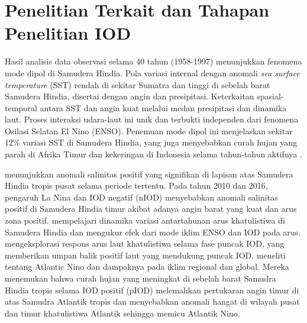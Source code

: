 \vspace{1.5pc}
\vspace{-1pc}
\section[Penelitian Terkait dan Tahapan Penelitian IOD]{Penelitian Terkait dan Tahapan Penelitian IOD}
\begin{spacing}{1.5}
	Hasil analisis data observasi selama 40 tahun (1958-1997) menunjukkan fenomena mode dipol di Samudera Hindia. Pola variasi internal dengan anomali \textit{sea surface temperature} (SST) rendah di sekitar Sumatra dan tinggi di sebelah barat Samudera Hindia, disertai dengan angin dan presipitasi. Keterkaitan spasial-temporal antara SST dan angin kuat melalui medan presipitasi dan dinamika laut. Proses interaksi udara-laut ini unik dan terbukti independen dari fenomena Osilasi Selatan El Nino (ENSO). Penemuan mode dipol ini menjelaskan sekitar 12\% variasi SST di Samudera Hindia, yang juga menyebabkan curah hujan yang parah di Afrika Timur dan kekeringan di Indonesia selama tahun-tahun aktifnya \cite{Saji1999}.
	
	 menunjukkan anomali salinitas positif yang signifikan di lapisan atas Samudera Hindia tropis pusat selama periode tertentu. Pada tahun 2010 dan 2016, pengaruh La Nina dan IOD negatif (nIOD) menyebabkan anomali salinitas positif di Samudera Hindia timur akibat adanya angin barat yang kuat dan arus zona positif.  mempelajari dinamika variasi antartahunan arus khatulistiwa di Samudera Hindia dan mengukur efek dari mode iklim ENSO dan IOD pada arus.  mengeksplorasi respons arus laut khatulistiwa selama fase puncak IOD, yang memberikan umpan balik positif laut yang mendukung puncak IOD.  meneliti tentang Atlantic Nino dan dampaknya pada iklim regional dan global. Mereka menemukan bahwa curah hujan yang meningkat di sebelah barat Samudra Hindia tropis selama IOD positif (pIOD) melemahkan pertukaran angin timur di atas Samudra Atlantik tropis dan menyebabkan anomali hangat di wilayah pusat dan timur khatulistiwa Atlantik sehingga memicu Atlantik Nino.
	

\end{spacing}
